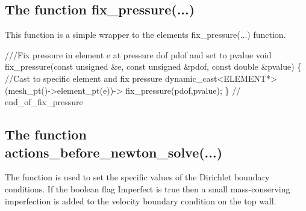 \hypertarget{index_fix_p}{}\subsection{The function fix\+\_\+pressure(...)}\label{index_fix_p}
This function is a simple wrapper to the element\textquotesingle{}s {\ttfamily fix\+\_\+pressure}(...) function.  
\begin{DoxyCodeInclude}
 \textcolor{comment}{///Fix pressure in element e at pressure dof pdof and set to pvalue}
 \textcolor{keywordtype}{void} fix\_pressure(\textcolor{keyword}{const} \textcolor{keywordtype}{unsigned} &e, \textcolor{keyword}{const} \textcolor{keywordtype}{unsigned} &pdof, 
                   \textcolor{keyword}{const} \textcolor{keywordtype}{double} &pvalue)
  \{
   \textcolor{comment}{//Cast to specific element and fix pressure}
   \textcolor{keyword}{dynamic\_cast<}ELEMENT*\textcolor{keyword}{>}(mesh\_pt()->element\_pt(e))->
    fix\_pressure(pdof,pvalue);
  \} \textcolor{comment}{// end\_of\_fix\_pressure}

\end{DoxyCodeInclude}




 

\hypertarget{index_actions_before}{}\subsection{The function actions\+\_\+before\+\_\+newton\+\_\+solve(...)}\label{index_actions_before}
The function is used to set the specific values of the Dirichlet boundary conditions. If the boolean flag {\ttfamily Imperfect} is true then a small mass-\/conserving imperfection is added to the velocity boundary condition on the top wall.

